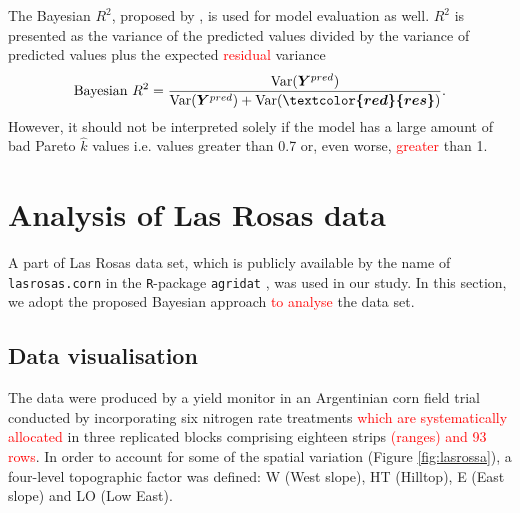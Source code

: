 \documentclass[a4paper]{article}   	%
\newcommand{\Var}{\mathrm{Var}}
\newcommand{\R}{\texttt{R}}
\begin{document}
	
	
	
	
	
	The Bayesian $R^2$, proposed by \textcite{Gelman2019Rsquared}, is used for model evaluation as well. $R^2$ is presented as the variance of the predicted values divided by the variance of predicted values plus the expected \textcolor{red}{residual} variance 
	\begin{eqnarray}
		\mbox{Bayesian } R^2 = \frac{\Var(\bm{Y}^{pred})}{\Var (\bm{Y}^{pred})+\Var(\bm{\textcolor{red}{res}})}.
	\end{eqnarray}
	However, it should not be interpreted solely if the model has a large amount of bad Pareto $\hat{k}$ values i.e. values greater than 0.7 or, even worse, \textcolor{red}{greater} than 1. 
	
	
	
	\section{Analysis of Las Rosas data}\label{sec:analysis}
	
	A part of Las Rosas data set, which is publicly available by the name of \texttt{lasrosas.corn} in the \R-package \texttt{agridat} \parencite{Edmondson2014Agridat}, was used in our study. In this section, we adopt the proposed Bayesian approach \textcolor{red}{to analyse} the data set. 
	
	
	\subsection{Data visualisation}
	
	The data were produced by a yield monitor in an Argentinian corn field trial conducted by incorporating six nitrogen rate treatments \textcolor{red}{which are systematically allocated} in three replicated blocks comprising eighteen strips \textcolor{red}{(ranges) and 93 rows}. In order to account for some of the spatial variation (Figure \ref{fig:lasrossa}), a four-level topographic factor was defined: W (West slope), HT (Hilltop), E (East slope) and LO (Low East).  
	
\end{document}
